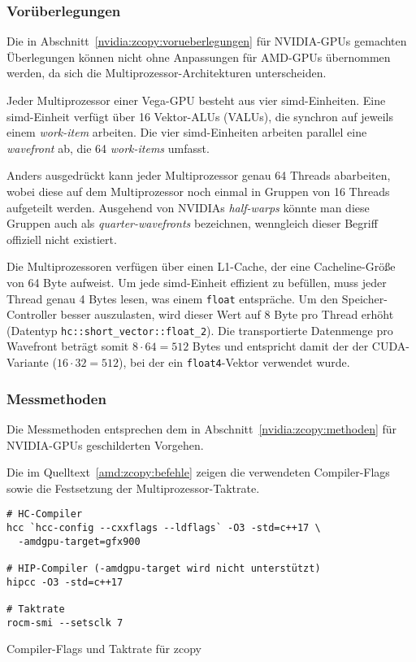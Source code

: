 \subsubsection{Vorüberlegungen}

Die in Abschnitt~\ref{nvidia:zcopy:vorueberlegungen} für NVIDIA-GPUs gemachten
Überlegungen können nicht ohne Anpassungen für AMD-GPUs übernommen werden, da
sich die Multiprozessor-Architekturen unterscheiden.

Jeder Multiprozessor einer Vega-GPU besteht aus vier \gls{simd}-Einheiten. Eine
\gls{simd}-Einheit verfügt über 16 Vektor-ALUs (VALUs), die synchron auf jeweils
einem \textit{work-item} arbeiten. Die vier \gls{simd}-Einheiten arbeiten
parallel eine \textit{wavefront} ab, die 64 \textit{work-items} umfasst.

Anders ausgedrückt kann jeder Multiprozessor genau 64 Threads abarbeiten, wobei
diese auf dem Multiprozessor noch einmal in Gruppen von 16 Threads aufgeteilt
werden. Ausgehend von NVIDIAs \textit{half-warps} könnte man diese Gruppen auch
als \textit{quarter-wavefronts} bezeichnen, wenngleich dieser Begriff offiziell
nicht existiert.

Die Multiprozessoren verfügen über einen L1-Cache, der eine Cacheline-Größe von
64 Byte aufweist. Um jede \gls{simd}-Einheit effizient zu befüllen, muss jeder
Thread genau 4 Bytes lesen, was einem \texttt{float} entspräche. Um den
Speicher-Controller besser auszulasten, wird dieser Wert auf 8 Byte pro Thread
erhöht (Datentyp \texttt{hc::short\_vector::float\_2}). Die transportierte
Datenmenge pro Wavefront beträgt somit $8 \cdot 64 = 512$ Bytes und entspricht
damit der der CUDA-Variante ($16 \cdot 32 = 512$), bei der ein
\texttt{float4}-Vektor verwendet wurde.

\subsubsection{Messmethoden}

Die Messmethoden entsprechen dem in Abschnitt~\ref{nvidia:zcopy:methoden}
für NVIDIA-GPUs geschilderten Vorgehen.

Die im Quelltext~\ref{amd:zcopy:befehle} zeigen die verwendeten Compiler-Flags
sowie die Festsetzung der Multiprozessor-Taktrate.

\begin{code}
    \begin{verbatim}
# HC-Compiler
hcc `hcc-config --cxxflags --ldflags` -O3 -std=c++17 \
  -amdgpu-target=gfx900

# HIP-Compiler (-amdgpu-target wird nicht unterstützt)
hipcc -O3 -std=c++17

# Taktrate
rocm-smi --setsclk 7
    \end{verbatim}
    \caption{Compiler-Flags und Taktrate für zcopy}
    \label{amd:zcopy:befehle}
\end{code}

